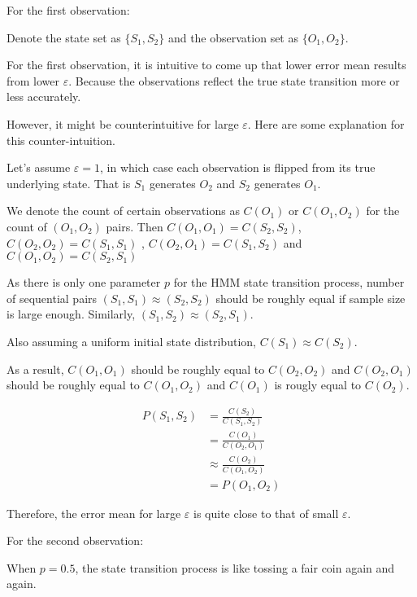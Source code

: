 \documentclass[paper=a4, fontsize=11pt]{scrartcl} %
\numberwithin{equation}{section} %
\numberwithin{figure}{section} %
\numberwithin{table}{section} %
\begin{document}
For the first observation:\newline

Denote the state set as $\{S_1, S_2\}$ and the observation set as $\{O_1, O_2\}$. \newline

For the first observation, it is intuitive to come up that lower error mean results from lower $\varepsilon$. Because the observations reflect the true state transition more or less accurately. 

However, it might be counterintuitive for large $\varepsilon$. Here are some explanation for this counter-intuition. \newline

Let's assume $\varepsilon=1$, in which case each observation is flipped from its true underlying state. That is $S_1$ generates $O_2$ and $S_2$ generates $O_1$. 

We denote the count of certain observations as $C (O_1)$ or $C (O_1, O_2)$ for the count of $(O_1, O_2)$ pairs. Then $C (O_1, O_1) = C (S_2, S_2)$, $C (O_2, O_2) = C (S_1, S_1)$ , $C (O_2, O_1) = C (S_1, S_2)$ and $C (O_1, O_2) = C (S_2, S_1)$ 

As there is only one parameter $p$ for the HMM state transition process, number of sequential pairs $(S_1,S_1) \approx (S_2,S_2)$ should be roughly equal if sample size is large enough. Similarly, $(S_1, S_2) \approx (S_2, S_1)$. 

Also assuming a uniform initial state distribution, $C (S_1) \approx C (S_2)$. \newline

As a result, $C (O_1, O_1)$  should be roughly equal to $C (O_2, O_2)$ and $C (O_2, O_1)$  should be roughly equal to $C (O_1, O_2)$ and $C (O_1)$ is rougly equal to $C (O_2)$. 

\begin {align*}
  P (S_1, S_2) &= \frac {C (S_2)} {C (S_1, S_2)} \\
  &= \frac {C (O_1)} {C (O_2, O_1)} \\
  &\approx \frac {C (O_2)} {C (O_1, O_2)}\\
  &=P (O_1, O_2)
\end {align*}

Therefore, the error mean for large $\varepsilon$ is quite close to that of small $\varepsilon$.

For the second observation:\newline

When $p=0.5$, the state transition process is like tossing a fair coin again and again.
\end{document}

